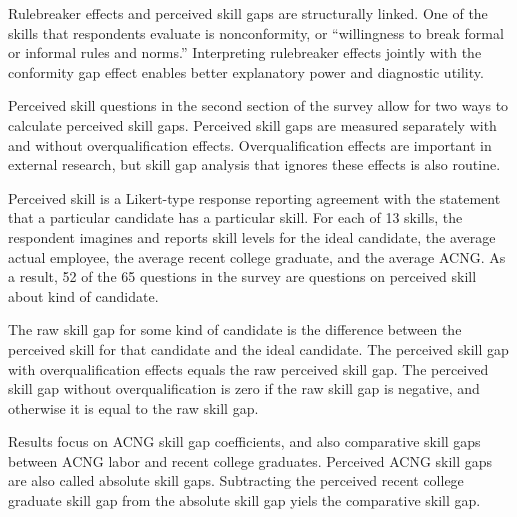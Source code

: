 \documentclass[review]{elsarticle}
\begin{document}
Rulebreaker effects and perceived skill gaps are structurally linked.
One of the skills that respondents evaluate is nonconformity, or ``willingness to break formal or informal rules and norms.''
Interpreting rulebreaker effects jointly with the conformity gap effect
enables better explanatory power and diagnostic utility.

Perceived skill questions in the second section of the survey allow for two ways to calculate perceived skill gaps.
Perceived skill gaps are measured separately with and without overqualification effects.
Overqualification effects are important in external research\cite{green2007there, raybould2005over}, but skill gap analysis that ignores these effects is also routine\cite{blake_2018}.

Perceived skill is a Likert-type response reporting agreement with the statement that a particular candidate has a particular skill.
For each of 13 skills, the respondent imagines and reports skill levels for the ideal candidate,
the average actual employee,
the average recent college graduate,
and the average ACNG.
As a result, 52 of the 65 questions in the survey are questions on perceived skill about kind of candidate.

The raw skill gap for some kind of candidate is the difference between the perceived skill for that candidate and the ideal candidate.
The perceived skill gap with overqualification effects equals the raw perceived skill gap.
The perceived skill gap without overqualification is zero if the raw skill gap is negative,
and otherwise it is equal to the raw skill gap.

Results focus on ACNG skill gap coefficients, and also comparative skill gaps between ACNG labor and recent college graduates.
Perceived ACNG skill gaps are also called absolute skill gaps.
Subtracting the perceived recent college graduate skill gap from the absolute skill gap yiels the comparative skill gap.
\end{document}
